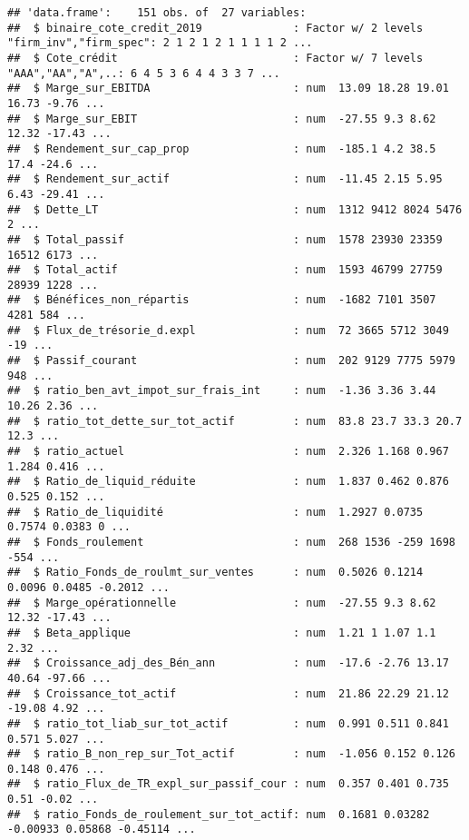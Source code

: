 \documentclass[
]{article}
\begin{document}
\begin{verbatim}
## 'data.frame':    151 obs. of  27 variables:
##  $ binaire_cote_credit_2019              : Factor w/ 2 levels "firm_inv","firm_spec": 2 1 2 1 2 1 1 1 1 2 ...
##  $ Cote_crédit                           : Factor w/ 7 levels "AAA","AA","A",..: 6 4 5 3 6 4 4 3 3 7 ...
##  $ Marge_sur_EBITDA                      : num  13.09 18.28 19.01 16.73 -9.76 ...
##  $ Marge_sur_EBIT                        : num  -27.55 9.3 8.62 12.32 -17.43 ...
##  $ Rendement_sur_cap_prop                : num  -185.1 4.2 38.5 17.4 -24.6 ...
##  $ Rendement_sur_actif                   : num  -11.45 2.15 5.95 6.43 -29.41 ...
##  $ Dette_LT                              : num  1312 9412 8024 5476 2 ...
##  $ Total_passif                          : num  1578 23930 23359 16512 6173 ...
##  $ Total_actif                           : num  1593 46799 27759 28939 1228 ...
##  $ Bénéfices_non_répartis                : num  -1682 7101 3507 4281 584 ...
##  $ Flux_de_trésorie_d.expl               : num  72 3665 5712 3049 -19 ...
##  $ Passif_courant                        : num  202 9129 7775 5979 948 ...
##  $ ratio_ben_avt_impot_sur_frais_int     : num  -1.36 3.36 3.44 10.26 2.36 ...
##  $ ratio_tot_dette_sur_tot_actif         : num  83.8 23.7 33.3 20.7 12.3 ...
##  $ ratio_actuel                          : num  2.326 1.168 0.967 1.284 0.416 ...
##  $ Ratio_de_liquid_réduite               : num  1.837 0.462 0.876 0.525 0.152 ...
##  $ Ratio_de_liquidité                    : num  1.2927 0.0735 0.7574 0.0383 0 ...
##  $ Fonds_roulement                       : num  268 1536 -259 1698 -554 ...
##  $ Ratio_Fonds_de_roulmt_sur_ventes      : num  0.5026 0.1214 0.0096 0.0485 -0.2012 ...
##  $ Marge_opérationnelle                  : num  -27.55 9.3 8.62 12.32 -17.43 ...
##  $ Beta_applique                         : num  1.21 1 1.07 1.1 2.32 ...
##  $ Croissance_adj_des_Bén_ann            : num  -17.6 -2.76 13.17 40.64 -97.66 ...
##  $ Croissance_tot_actif                  : num  21.86 22.29 21.12 -19.08 4.92 ...
##  $ ratio_tot_liab_sur_tot_actif          : num  0.991 0.511 0.841 0.571 5.027 ...
##  $ ratio_B_non_rep_sur_Tot_actif         : num  -1.056 0.152 0.126 0.148 0.476 ...
##  $ ratio_Flux_de_TR_expl_sur_passif_cour : num  0.357 0.401 0.735 0.51 -0.02 ...
##  $ ratio_Fonds_de_roulement_sur_tot_actif: num  0.1681 0.03282 -0.00933 0.05868 -0.45114 ...
\end{verbatim}
\end{document}
